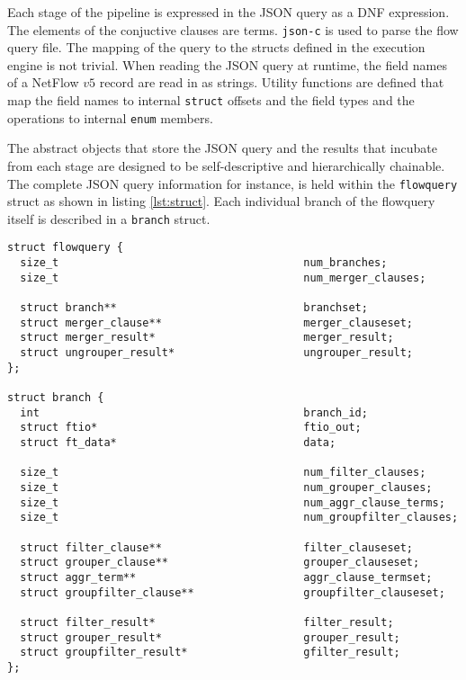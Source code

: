 Each stage of the pipeline is expressed in the JSON query as a \ac{DNF}
expression. The elements of the conjuctive clauses are terms.  \texttt{json-c}
\cite{jsonc} is used to parse the flow query file. The mapping of the query to
the structs defined in the execution engine is not trivial.  When reading the
JSON query at runtime, the field names of a NetFlow $v5$ record are read in as
strings.  Utility functions are defined that map the field names to internal
\texttt{struct} offsets and the field types and the operations to internal
\texttt{enum} members.

The abstract objects that store the JSON query and the results that incubate
from each stage are designed to be self-descriptive and hierarchically
chainable.  The complete JSON query information for instance, is held within
the \texttt{flowquery} struct as shown in listing \ref{lst:struct}. Each
individual branch of the flowquery itself is described in a \texttt{branch}
struct.

\begin{lstlisting}
struct flowquery {
  size_t                                      num_branches;
  size_t                                      num_merger_clauses;

  struct branch**                             branchset;
  struct merger_clause**                      merger_clauseset;
  struct merger_result*                       merger_result;
  struct ungrouper_result*                    ungrouper_result;
};

struct branch {
  int                                         branch_id;
  struct ftio*                                ftio_out;
  struct ft_data*                             data;

  size_t                                      num_filter_clauses;
  size_t                                      num_grouper_clauses;
  size_t                                      num_aggr_clause_terms;
  size_t                                      num_groupfilter_clauses;

  struct filter_clause**                      filter_clauseset;
  struct grouper_clause**                     grouper_clauseset;
  struct aggr_term**                          aggr_clause_termset;
  struct groupfilter_clause**                 groupfilter_clauseset;

  struct filter_result*                       filter_result;
  struct grouper_result*                      grouper_result;
  struct groupfilter_result*                  gfilter_result;
};
\end{lstlisting}

